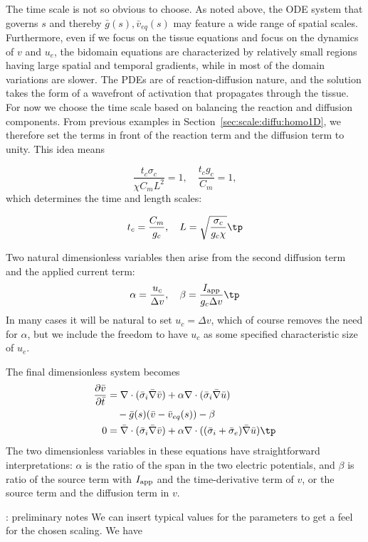 \documentclass[graybox,envcountchap,sectrefs,final]{svmonodo}
\newcommand{\shortinlinecomment}[3]{{\color{red}{\bf #1}: #2}}
\begin{document}
The time scale is not so obvious to choose. As noted above, the ODE
system that governs $s$ and thereby $\bar g(s), \bar v_{eq} (s)$ may
feature a wide range of spatial scales. Furthermore, even if we focus
on the tissue equations and focus on the dynamics of $v$ and $u_e$,
the bidomain equations are characterized by relatively small regions
having large spatial and temporal gradients, while in most of the
domain variations are slower. The PDEs are of reaction-diffusion
nature, and the solution takes the form of a wavefront of activation
that propagates through the tissue. For now we choose the time scale
based on balancing the reaction and diffusion components.  From
previous examples in Section~\ref{sec:scale:diffu:homo1D}, we therefore
set the terms in front of the reaction term and the diffusion term to
unity.  This idea means

\[ \frac{t_c\sigma_c}{\chi C_mL^2} = 1,\quad \frac{t_cg_c}{C_m} =1,\]
which determines the time and length scales:

\[ t_c = \frac{C_m}{g_c},\quad L = \sqrt{\frac{\sigma_c}{g_c \chi}}\tp\]

Two natural dimensionless variables then arise from the second diffusion
term and the applied current term:
\[ \alpha = \frac{u_c}{\Delta v}, \quad \beta =
\frac{I_{\rm{app}}}{g_c \Delta v} \tp\]
In many cases it will be natural to set $u_c=\Delta v$, which of
course removes the need for $\alpha$, but we
include the freedom to have $u_c$ as
some specified characteristic size of $u_e$.

The final dimensionless system becomes
\begin{align}
\frac{\partial \bar v}{\partial \bar t} &=
\nabla\cdot( \bar \sigma_i\bar\nabla\bar v) +
\alpha\nabla\cdot (\bar \sigma_i\bar \nabla \bar u) \\ 
& \quad -\bar g (s)(\bar v-\bar v_{eq}(s))
- \beta
\\ 
0 &= \bar \nabla\cdot( \bar \sigma_i\bar \nabla \bar v) +
\alpha\nabla\cdot ((\bar \sigma_i + \bar \sigma_e)\bar \nabla \bar u) \tp
\end{align}
The two dimensionless variables in these equations have
straightforward
interpretations: $\alpha$ is the ratio of the span in the two electric
potentials, and $\beta$ is ratio of the source term with $I_{\rm{app}}$ and the
time-derivative term of $v$, or the source term and the diffusion term
in $v$.

\shortinlinecomment{js 22}{ preliminary notes }{ preliminary notes }
We can insert typical values for the parameters to get a feel for the
chosen scaling. We have
\end{document}
